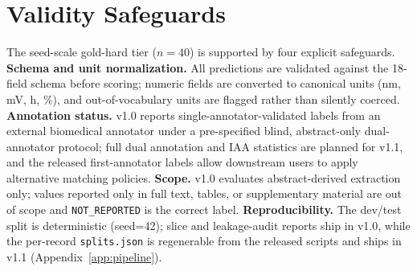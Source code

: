 \documentclass{article}
\newcommand{\NR}{\texttt{NOT\_REPORTED}}
\begin{document}

\section{Validity Safeguards}
\label{sec:validity}

The seed-scale gold-hard tier ($n=40$) is supported by four explicit safeguards. \textbf{Schema and unit normalization.} All predictions are validated against the 18-field schema before scoring; numeric fields are converted to canonical units (nm, mV, h, \%), and out-of-vocabulary units are flagged rather than silently coerced. \textbf{Annotation status.} v1.0 reports single-annotator-validated labels from an external biomedical annotator under a pre-specified blind, abstract-only dual-annotator protocol; full dual annotation and IAA statistics are planned for v1.1, and the released first-annotator labels allow downstream users to apply alternative matching policies. \textbf{Scope.} v1.0 evaluates abstract-derived extraction only; values reported only in full text, tables, or supplementary material are out of scope and \NR{} is the correct label. \textbf{Reproducibility.} The dev/test split is deterministic (seed=42); slice and leakage-audit reports ship in v1.0, while the per-record \texttt{splits.json} is regenerable from the released scripts and ships in v1.1 (Appendix~\ref{app:pipeline}).



\end{document}
